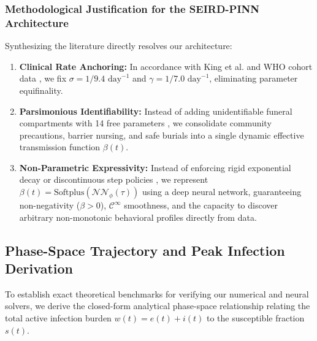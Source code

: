 \documentclass[11pt,a4paper]{article}
\begin{document}
\subsubsection{Methodological Justification for the SEIRD-PINN Architecture}
Synthesizing the literature directly resolves our architecture:
\begin{enumerate}
    \item \textbf{Clinical Rate Anchoring:} In accordance with King et al. \cite{king2015avoidable} and WHO cohort data \cite{who2014ebola}, we fix $\sigma = 1/9.4\text{ day}^{-1}$ and $\gamma = 1/7.0\text{ day}^{-1}$, eliminating parameter equifinality.
    \item \textbf{Parsimonious Identifiability:} Instead of adding unidentifiable funeral compartments with 14 free parameters \cite{legrand2007understanding}, we consolidate community precautions, barrier nursing, and safe burials into a single dynamic effective transmission function $\beta(t)$.
    \item \textbf{Non-Parametric Expressivity:} Instead of enforcing rigid exponential decay \cite{althaus2014estimating} or discontinuous step policies \cite{rivers2014modeling}, we represent $\beta(t) = \text{Softplus}(\mathcal{NN}_\phi(\tau))$ using a deep neural network, guaranteeing non-negativity ($\beta > 0$), $\mathcal{C}^\infty$ smoothness, and the capacity to discover arbitrary non-monotonic behavioral profiles directly from data.
\end{enumerate}

\subsection{Phase-Space Trajectory and Peak Infection Derivation}
To establish exact theoretical benchmarks for verifying our numerical and neural solvers, we derive the closed-form analytical phase-space relationship relating the total active infection burden $w(t) = e(t) + i(t)$ to the susceptible fraction $s(t)$.
\end{document}
